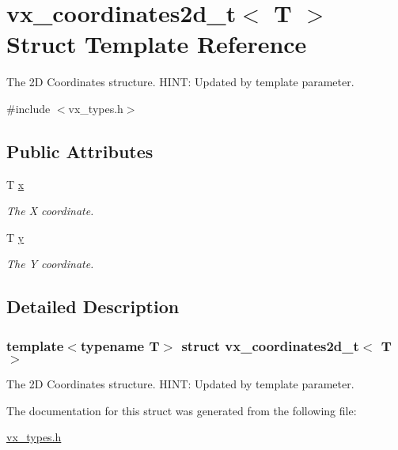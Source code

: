 \hypertarget{structvx__coordinates2d__t}{}\section{vx\+\_\+coordinates2d\+\_\+t$<$ T $>$ Struct Template Reference}
\label{structvx__coordinates2d__t}


The 2D Coordinates structure. H\+I\+NT\+: Updated by template parameter.  




{\ttfamily \#include $<$vx\+\_\+types.\+h$>$}

\subsection*{Public Attributes}
\begin{DoxyCompactItemize}
\item 
\mbox{\label{structvx__coordinates2d__t_a768ca60ba52653406d99136b8f4f47d0}} 
T \hyperlink{structvx__coordinates2d__t_a768ca60ba52653406d99136b8f4f47d0}{x}
\begin{DoxyCompactList}\small\item\em The X coordinate. \end{DoxyCompactList}\item 
\mbox{\label{structvx__coordinates2d__t_a90f1b7298ccd145fce514ce79fa36d87}} 
T \hyperlink{structvx__coordinates2d__t_a90f1b7298ccd145fce514ce79fa36d87}{y}
\begin{DoxyCompactList}\small\item\em The Y coordinate. \end{DoxyCompactList}\end{DoxyCompactItemize}


\subsection{Detailed Description}
\subsubsection*{template$<$typename T$>$\newline
struct vx\+\_\+coordinates2d\+\_\+t$<$ T $>$}

The 2D Coordinates structure. H\+I\+NT\+: Updated by template parameter. 

The documentation for this struct was generated from the following file\+:\begin{DoxyCompactItemize}
\item 
\hyperlink{vx__types_8h}{vx\+\_\+types.\+h}\end{DoxyCompactItemize}

